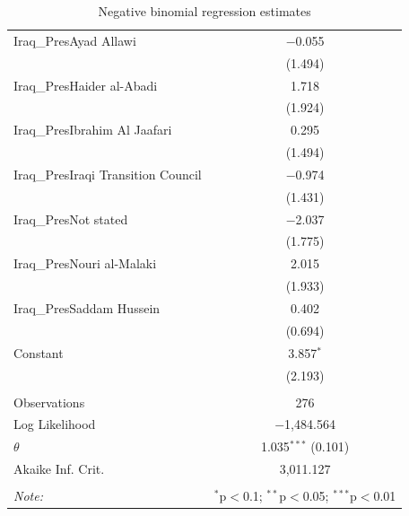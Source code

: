 \begin{table}[ht]
\begin{adjustbox}{width=1\textwidth}
\begin{tabular}{@{\extracolsep{5pt}}lc}
 Iraq\_PresAyad Allawi & $-$0.055 \\ 
  & (1.494) \\ 
 Iraq\_PresHaider al-Abadi & 1.718 \\ 
  & (1.924) \\ 
 Iraq\_PresIbrahim Al Jaafari & 0.295 \\ 
  & (1.494) \\ 
 Iraq\_PresIraqi Transition Council & $-$0.974 \\ 
  & (1.431) \\ 
 Iraq\_PresNot stated & $-$2.037 \\ 
  & (1.775) \\ 
 Iraq\_PresNouri al-Malaki & 2.015 \\ 
  & (1.933) \\ 
 Iraq\_PresSaddam Hussein & 0.402 \\ 
  & (0.694) \\ 
 Constant & 3.857$^{*}$ \\ 
  & (2.193) \\ 
\hline \\[-1.8ex] 
Observations & 276 \\ 
Log Likelihood & $-$1,484.564 \\ 
$\theta$ & 1.035$^{***}$  (0.101) \\ 
Akaike Inf. Crit. & 3,011.127 \\ 
\hline 
\hline \\[-1.8ex] 
\textit{Note:}  & \multicolumn{1}{r}{$^{*}$p$<$0.1; $^{**}$p$<$0.05; $^{***}$p$<$0.01} \ 
\end{tabular}
\end{adjustbox}
\caption{Negative binomial regression estimates} 
\end{table} 

